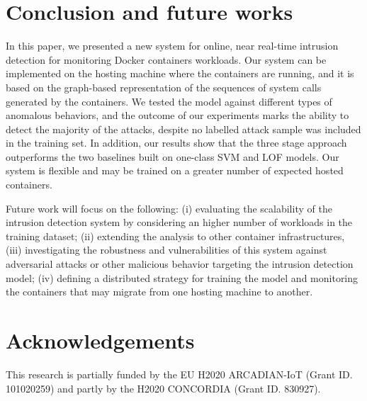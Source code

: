 \section{Conclusion and future works}\label{sec:concl}

In this paper, we presented a new system for online, near real-time intrusion detection for monitoring Docker containers workloads. Our system can be implemented on the hosting machine where the containers are running, and it is based on the graph-based representation of the sequences of system calls generated by the containers. 
We tested the model against different types of anomalous behaviors, and the outcome of our experiments marks the ability to detect the majority of the attacks, despite no labelled attack sample was included in the training set. In addition, our results show that the three stage approach outperforms the two baselines built on one-class SVM and LOF models. Our system is flexible and may be trained on a greater number of expected hosted containers.

Future work will focus on the following: (i) evaluating the scalability of the intrusion detection system by considering an higher number of workloads in the training dataset;  (ii) extending the analysis to other container infrastructures, (iii) investigating the robustness and vulnerabilities of this system against adversarial attacks or other malicious behavior targeting the intrusion detection model; (iv) defining a distributed strategy for training the model and monitoring the containers that may migrate from one hosting machine to another.

\section{Acknowledgements}\label{sec:ack}
This research is partially funded by the EU H2020 ARCADIAN-IoT (Grant ID. 101020259) and partly by the H2020 CONCORDIA (Grant ID. 830927).